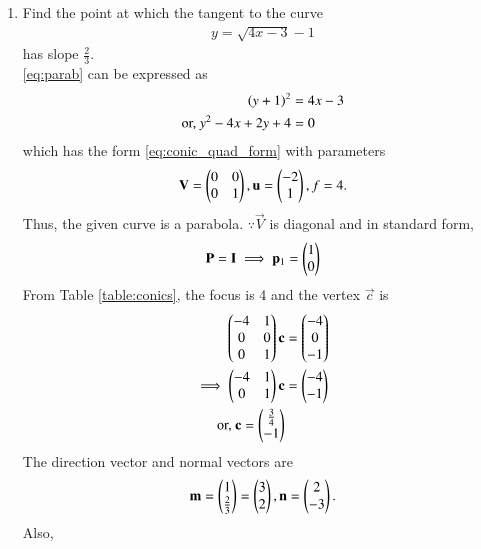 \renewcommand{\theequation}{\theenumi}
\begin{enumerate}[label=\thesubsection.\arabic*.,ref=\thesubsection.\theenumi]
\item 
Find the point at which the tangent to the curve 
\begin{align}
y = \sqrt{4x-3}-1
\label{eq:parab}
\end{align}
has slope $\frac{2}{3}$.
\\
\solution \eqref{eq:parab} can be expressed as
\begin{align}
\left(y+1\right)^2 &= 4x-3
\\
\text{or, } y^2  -4x + 2y+ 4 &= 0
\label{eq:parab_twovar}
\end{align}
which has the form \eqref{eq:conic_quad_form} with parameters
\begin{align}
\mathbf{V} = \begin{pmatrix}0 & 0\\0 & 1\end{pmatrix}, \mathbf{u} = \begin{pmatrix}-2\\1\end{pmatrix}, f = 4.
\label{eq:parab_twovar_params}
\end{align}
Thus, the given curve is a parabola.  $\because \vec{V}$ is diagonal and in standard form,
\begin{align}
\mathbf{P} = \mathbf{I} \implies \mathbf{p}_1 = \begin{pmatrix}1\\0\end{pmatrix}
\label{eq:parab_ex1_eig}
\end{align}
From Table \ref{table:conics}, the 
focus is 4
and the vertex $\vec{c}$ is
\begin{align}
\begin{pmatrix} -4 & 1 \\ 0 & 0 \\ 0 & 1\end{pmatrix}\mathbf{c} &= \begin{pmatrix}-4 \\ 0\\-1\end{pmatrix} 
\\
\implies 
\begin{pmatrix} -4 & 1 \\  0 & 1\end{pmatrix}\mathbf{c} &= \begin{pmatrix}-4 \\ -1\end{pmatrix} 
\\
\text{or, } \mathbf{c} = \begin{pmatrix}\frac{3}{4}\\-1\end{pmatrix}
\end{align}
The direction vector and normal vectors are
\begin{align}
\mathbf{m} = \begin{pmatrix}1 \\ \frac{2}{3}\end{pmatrix} = \begin{pmatrix}3\\2\end{pmatrix}, \mathbf{n} = \begin{pmatrix}2\\-3\end{pmatrix}.
\label{eq:parab_twovar_mn}
\end{align}
Also, 
\begin{align}

\end{align}
\end{enumerate}
